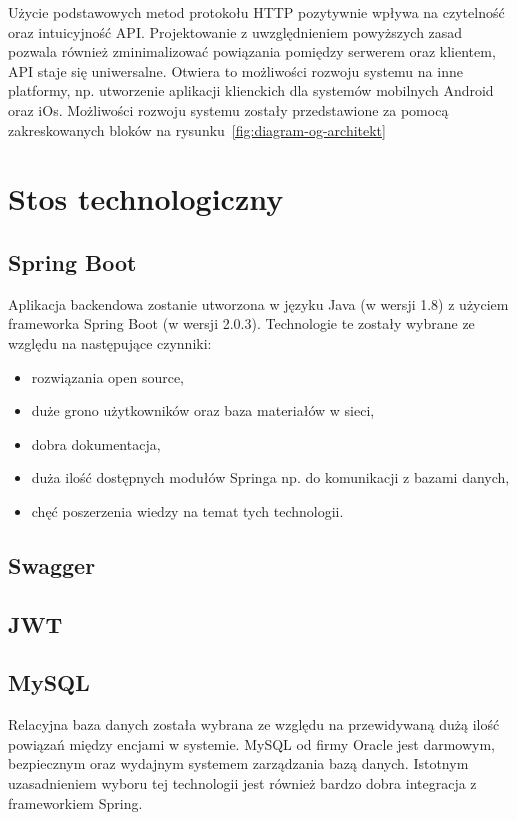 Użycie podstawowych metod protokołu HTTP pozytywnie wpływa na czytelność oraz intuicyjność API. Projektowanie z uwzględnieniem powyższych zasad pozwala również zminimalizować powiązania pomiędzy serwerem oraz klientem, API staje się uniwersalne. Otwiera to możliwości rozwoju systemu na inne platformy, np. utworzenie aplikacji klienckich dla systemów mobilnych Android oraz iOs. Możliwości rozwoju systemu zostały przedstawione za pomocą zakreskowanych bloków na rysunku~\ref{fig:diagram-og-architekt}

\section{Stos technologiczny}

\subsection{Spring Boot}

Aplikacja backendowa zostanie utworzona w języku Java (w wersji 1.8) z użyciem frameworka Spring Boot (w wersji 2.0.3). Technologie te zostały wybrane ze względu na następujące czynniki:
 \begin{itemize}
\item rozwiązania open source,
\item duże grono użytkowników oraz baza materiałów w sieci,
\item dobra dokumentacja,
\item duża ilość dostępnych modułów Springa np. do komunikacji z bazami danych,
\item chęć poszerzenia wiedzy na temat tych technologii.
\end{itemize}

\subsection{Swagger}

\subsection{JWT}

\subsection{MySQL} 

Relacyjna baza danych została wybrana ze względu na przewidywaną dużą ilość powiązań między encjami w systemie. MySQL od firmy Oracle jest darmowym, bezpiecznym oraz wydajnym systemem zarządzania bazą danych.  Istotnym uzasadnieniem wyboru tej technologii jest również bardzo dobra integracja z frameworkiem Spring.

